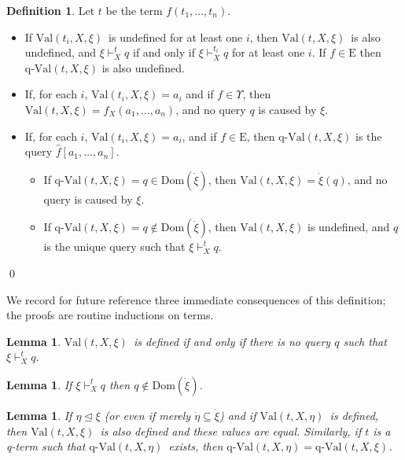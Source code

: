 \documentclass{LMCS}
\newtheorem{la}[thm]{Lemma}
\theoremstyle{definition}
\newtheorem{df}[thm]{Definition}
\newenvironment{ls}{\begin{itemize}}{\end{itemize}}
\newcommand{\E}{\mathrm{E}}
\newcommand{\U}{\Upsilon}
\newcommand{\ans}{\dot}
\newcommand{\dom}[1]{\ensuremath{{\text{Dom}}(#1)}}
\newcommand{\initeq}{\unlhd}
\newcommand{\qval}[3]{\ensuremath{\text{q-Val}(#1,#2,#3)}}
\newcommand{\val}[3]{\ensuremath{\text{Val}(#1,#2,#3)}}
\begin{document}
\begin{df}   \label{term-val-def}
  Let $t$ be the term $f(t_1,\dots,t_n)$.
  \begin{ls}

   \item If \val{t_i}X\xi\ is undefined for at least one $i$, then
    \val tX\xi\ is also undefined, and $\xi\vdash^t_Xq$ if and only
    if $\xi\vdash^{t_i}_Xq$ for at least one $i$. If $f \in
    \E$ then $\qval tX\xi$ is also undefined.

   \item If, for each $i$, $\val{t_i}X\xi=a_i$ and if $f\in\U$,
    then $\val tX\xi=f_X(a_1,\dots,a_n)$, and no query $q$ is
    caused by $\xi$.

   \item If, for each $i$, $\val{t_i}X\xi=a_i$, and if $f\in \E$, then
    $\qval tX\xi$ is the query $\hat f[a_1,\dots,a_n]$.

   \begin{ls}

    \item If $\qval tX\xi = q \in \dom{\ans \xi}$, then $\val
    tX\xi=\ans\xi(q)$, and no query is caused by $\xi$.

    \item If $\qval tX\xi = q \notin \dom{\ans \xi}$, then $\val tX\xi$ is
    undefined, and $q$ is the unique query such that $\xi\vdash^t_Xq$.
    \end{ls}
  \end{ls}
\qed\end{df}


We record for future reference three immediate consequences of this
definition; the proofs are routine inductions on terms.

\begin{la}   \label{df-noq-t}
  \val tX\xi\ is defined if and only if there is no query
$q$ such that $\xi\vdash^t_Xq$.
\end{la}

\begin{la}   \label{no-rep-t}
If $\xi\vdash^t_Xq$ then $q\notin\dom{\ans\xi}$.
\end{la}

\begin{la} \label{mon-t} If $\eta\initeq\xi$ (or even if merely
  $\ans\eta\subseteq\ans\xi$) and if \val tX\eta\ is defined, then
  \val tX\xi\ is also defined and these values are equal.  Similarly,
  if $t$ is a q-term such that \qval tX\eta\ exists, then $\qval
  tX\eta=\qval tX\xi$.

\end{la}
\end{document}
